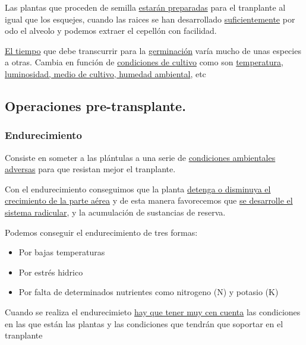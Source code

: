 \documentclass[a4paper,12pt,oneside]{article}
\begin{document}
Las plantas que proceden de semilla \uline{estarán preparadas} para el tranplante al
igual que los esquejes, cuando las raices se han desarrollado \uline{suficientemente}
por odo el alveolo y podemos extraer el cepellón con facilidad. 

\uline{El tiempo} que debe transcurrir para la \uline{germinación} varía mucho de unas
especies a otras. Cambia en función de \uline{condiciones de cultivo} como son
\uline{temperatura, luminosidad, medio de cultivo, humedad ambiental}, etc
\subsection{Operaciones pre-transplante.}
\label{sec:orgf821f9b}
\subsubsection{Endurecimiento}
\label{sec:org5542c4b}
Consiste en someter a las plántulas a una serie de \uline{condiciones ambientales
adversas} para que resistan  mejor el tranplante.

Con el  endurecimiento conseguimos que la planta \uline{detenga o disminuya el
crecimiento de la parte aérea} y de esta manera favorecemos que \uline{se desarrolle
el sistema radicular}, y la acumulación de sustancias de reserva. 

Podemos conseguir el endurecimiento de tres formas:
\begin{itemize}
\item Por bajas temperaturas
\item Por estrés hidrico
\item Por falta de determinados nutrientes como nitrogeno (N) y potasio (K)
\end{itemize}

Cuando se realiza el endurecimieto \uline{hay que tener muy cen cuenta} las
condiciones en las que están las plantas y las condiciones que tendrán que
soportar en el tranplante
\end{document}
